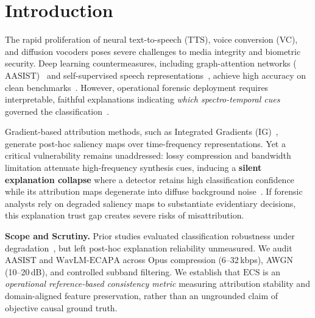 \documentclass[runningheads]{llncs}
\newcommand{\ecs}{\ensuremath{\mathrm{ECS}}}
\newcommand{\aasist}{\ensuremath{\mathrm{AASIST}}}
\newcommand{\wavlm}{\ensuremath{\mathrm{WavLM}\text{-}\mathrm{ECAPA}}}
\newcommand{\ig}{\ensuremath{\mathrm{IG}}}
\begin{document}
\section{Introduction}
\label{sec:intro}

The rapid proliferation of neural text-to-speech (TTS), voice conversion (VC), and diffusion vocoders poses severe challenges to media integrity and biometric security.
Deep learning countermeasures, including graph-attention networks (\aasist{})~\cite{jung2022aasist} and self-supervised speech representations~\cite{chen2022wavlm,tak2021rawnet2}, achieve high accuracy on clean benchmarks~\cite{yamagishi2021asvspoof}.
However, operational forensic deployment requires interpretable, faithful explanations indicating \emph{which spectro-temporal cues} governed the classification~\cite{ge2022explaining,grinberg2025xai,drozdowski2024xai}.

Gradient-based attribution methods, such as Integrated Gradients (\ig{})~\cite{sundararajan2017axiomatic}, generate post-hoc saliency maps over time-frequency representations.
Yet a critical vulnerability remains unaddressed: lossy compression and bandwidth limitation attenuate high-frequency synthesis cues, inducing a \textbf{silent explanation collapse} where a detector retains high classification confidence while its attribution maps degenerate into diffuse background noise~\cite{channing2024toward,muller2022does}.
If forensic analysts rely on degraded saliency maps to substantiate evidentiary decisions, this explanation trust gap creates severe risks of misattribution.

\textbf{Scope and Scrutiny.}
Prior studies evaluated classification robustness under degradation~\cite{muller2022does,valenti2024codec,li2025measuring,shi2025benchmarking}, but left post-hoc explanation reliability unmeasured.
We audit \aasist{} and \wavlm{} across Opus compression (6--32\,kbps), AWGN (10--20\,dB), and controlled subband filtering.
We establish that \ecs{} is an \emph{operational reference-based consistency metric} measuring attribution stability and domain-aligned feature preservation, rather than an ungrounded claim of objective causal ground truth.
\end{document}
